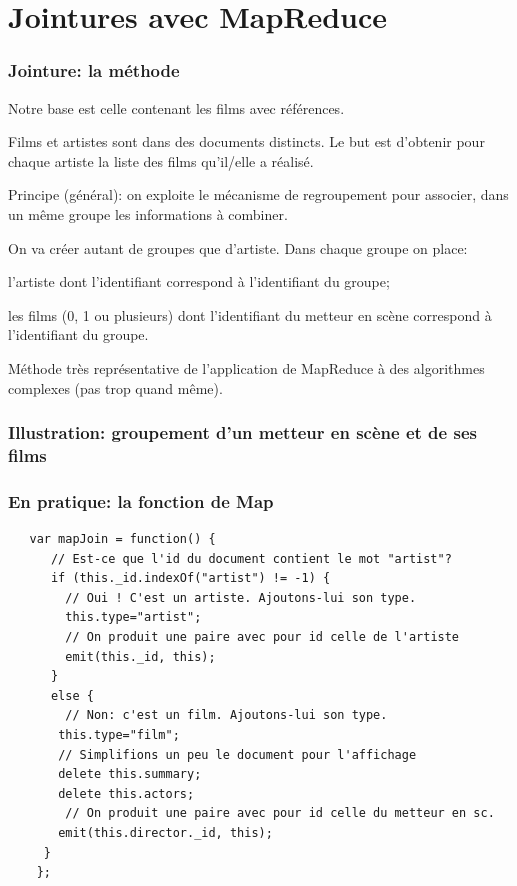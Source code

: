 \section{Jointures avec MapReduce}


\begin{frame}[fragile]
\frametitle{Jointure: la méthode}

Notre
base est celle contenant les films \alert{avec références}. 

\vfill

Films et artistes sont dans des documents \alert{distincts}.
Le but est  d'obtenir pour chaque artiste la liste des films qu'il/elle a réalisé.

\vfill

\alert{Principe (général)}:  on exploite 
le mécanisme de regroupement pour associer, dans un même groupe les informations à combiner.

\vfill

On va créer autant de groupes que d'artiste. Dans chaque groupe on place:

\begin{redbullet}
  \item l'artiste dont l'identifiant correspond à l'identifiant du groupe;
  \item les films (0, 1 ou plusieurs) dont l'identifiant \alert{du metteur en scène}
    correspond à l'identifiant du groupe.
\end{redbullet}

Méthode très représentative de l'application de  MapReduce à des algorithmes complexes (pas trop quand même).

\end{frame}


\begin{frame}[fragile]
\frametitle{Illustration: groupement d'un metteur en scène et de ses films}

\end{frame}

\begin{frame}[fragile]
\frametitle{En pratique: la fonction de Map}

\begin{verbatim}
   var mapJoin = function() {
      // Est-ce que l'id du document contient le mot "artist"?
      if (this._id.indexOf("artist") != -1) {
        // Oui ! C'est un artiste. Ajoutons-lui son type.
        this.type="artist";        
        // On produit une paire avec pour id celle de l'artiste
        emit(this._id, this);
      }
      else {
        // Non: c'est un film. Ajoutons-lui son type.
       this.type="film";
       // Simplifions un peu le document pour l'affichage
       delete this.summary;
       delete this.actors;
        // On produit une paire avec pour id celle du metteur en sc.
       emit(this.director._id, this);
     }
    };
\end{verbatim}

\end{frame}


